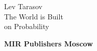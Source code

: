 \clearpage

\thispagestyle{empty}
\vspace*{2cm}
\begin{Huge}
\noindent
\textsf{ Lev Tarasov\\[1cm]
The World is Built \\ on Probability}\\[1cm]
\end{Huge}
\vspace{3.5cm}
\begin{center}
\begin{Large}
\textbf{MIR Publishers Moscow}
\end{Large}
\end{center}
\clearpage
\thispagestyle{empty}

